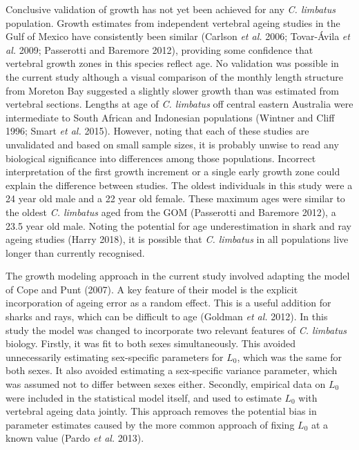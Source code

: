 \documentclass[]{article}
\begin{document}
Conclusive validation of growth has not yet been achieved for any
\emph{C. limbatus} population. Growth estimates from independent
vertebral ageing studies in the Gulf of Mexico have consistently been
similar (Carlson \emph{et al.} 2006; Tovar-Ávila \emph{et al.} 2009;
Passerotti and Baremore 2012), providing some confidence that vertebral
growth zones in this species reflect age. No validation was possible in
the current study although a visual comparison of the monthly length
structure from Moreton Bay suggested a slightly slower growth than was
estimated from vertebral sections. Lengths at age of \emph{C. limbatus}
off central eastern Australia were intermediate to South African and
Indonesian populations (Wintner and Cliff 1996; Smart \emph{et al.}
2015). However, noting that each of these studies are unvalidated and
based on small sample sizes, it is probably unwise to read any
biological significance into differences among those populations.
Incorrect interpretation of the first growth increment or a single early
growth zone could explain the difference between studies. The oldest
individuals in this study were a 24 year old male and a 22 year old
female. These maximum ages were similar to the oldest \emph{C. limbatus}
aged from the GOM (Passerotti and Baremore 2012), a 23.5 year old male.
Noting the potential for age underestimation in shark and ray ageing
studies (Harry 2018), it is possible that \emph{C. limbatus} in all
populations live longer than currently recognised.

The growth modeling approach in the current study involved adapting the
model of Cope and Punt (2007). A key feature of their model is the
explicit incorporation of ageing error as a random effect. This is a
useful addition for sharks and rays, which can be difficult to age
(Goldman \emph{et al.} 2012). In this study the model was changed to
incorporate two relevant features of \emph{C. limbatus} biology.
Firstly, it was fit to both sexes simultaneously. This avoided
unnecessarily estimating sex-specific parameters for \(L_0\), which was
the same for both sexes. It also avoided estimating a sex-specific
variance parameter, which was assumed not to differ between sexes
either. Secondly, empirical data on \(L_0\) were included in the
statistical model itself, and used to estimate \(L_0\) with vertebral
ageing data jointly. This approach removes the potential bias in
parameter estimates caused by the more common approach of fixing \(L_0\)
at a known value (Pardo \emph{et al.} 2013).
\end{document}
